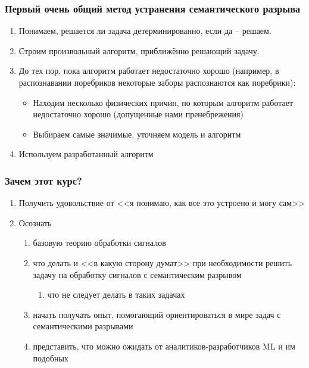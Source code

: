 \documentclass[main.tex]{subfiles}
\begin{document}
\subsubsection{Первый очень общий метод устранения семантического разрыва}

\begin{enumerate}[noitemsep]
    \item Понимаем, решается ли задача детерминированно, если да -- решаем.
    \item Строим произвольный алгоритм, приближённо решающий задачу.
    \item До тех пор, пока алгоритм работает недостаточно хорошо (например, в распознавании поребриков некоторые заборы распознаются как поребрики):
    \begin{itemize}[noitemsep]
        \item Находим несколько физических причин, по которым алгоритм работает недостаточно хорошо (допущенные нами пренебрежения)
        \item Выбираем самые значимые, уточняем модель и алгоритм
    \end{itemize}
    \item Используем разработанный алгоритм
\end{enumerate}

\subsubsection{Зачем этот курс?}

\begin{enumerate}[noitemsep]
    \item Получить удовольствие от <<я понимаю, как все это устроено и могу сам>>
    \item Осознать
    \begin{enumerate}[noitemsep]
        \item базовую теорию обработки сигналов
        \item что делать и <<в какую сторону думат>> при необходимости решить задачу на обработку сигналов с семантическим разрывом
        \begin{enumerate}[noitemsep]
            \item что не следует делать в таких задачах
        \end{enumerate}
        \item начать получать опыт, помогающий ориентироваться в мире задач с семантическими разрывами
        \item представить, что можно ожидать от аналитиков-разработчиков ML и им подобных
    \end{enumerate}
\end{enumerate}
\end{document}
